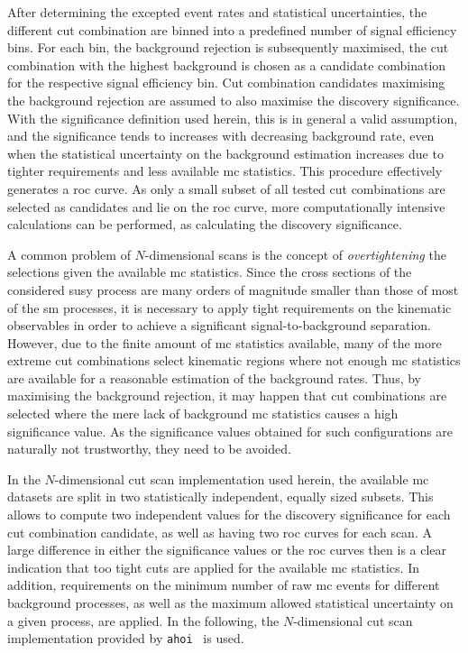 After determining the excepted event rates and statistical uncertainties, the different cut combination are binned into a predefined number of signal efficiency bins. For each bin, the background rejection is subsequently maximised, \ie the cut combination with the highest background is chosen as a candidate combination for the respective signal efficiency bin. Cut combination candidates maximising the background rejection are assumed to also maximise the discovery significance. With the significance definition used herein, this is in general a valid assumption, and the significance tends to increases with decreasing background rate, even when the statistical uncertainty on the background estimation increases due to tighter requirements and less available \gls{mc} statistics. This procedure effectively generates a \gls{roc} curve. As only a small subset of all tested cut combinations are selected as candidates and lie on the \gls{roc} curve, more computationally intensive calculations can be performed, as \eg calculating the discovery significance.

A common problem of $N$-dimensional scans is the concept of \textit{overtightening} the selections given the available \gls{mc} statistics. Since the cross sections of the considered \gls{susy} process are many orders of magnitude smaller than those of most of the \gls{sm} processes, it is necessary to apply tight requirements on the kinematic observables in order to achieve a significant signal-to-background separation. However, due to the finite amount of \gls{mc} statistics available, many of the more extreme cut combinations select kinematic regions where not enough \gls{mc} statistics are available for a reasonable estimation of the background rates. Thus, by maximising the background rejection, it may happen that cut combinations are selected where the mere lack of background \gls{mc} statistics causes a high significance value. As the significance values obtained for such configurations are naturally not trustworthy, they need to be avoided. 

In the $N$-dimensional cut scan implementation used herein, the available \gls{mc} datasets are split in two statistically independent, equally sized subsets. This allows to compute two independent values for the discovery significance for each cut combination candidate, as well as having two \gls{roc} curves for each scan. A large difference in either the significance values or the \gls{roc} curves then is a clear indication that too tight cuts are applied for the available \gls{mc} statistics. In addition, requirements on the minimum number of raw \gls{mc} events for different background processes, as well as the maximum allowed statistical uncertainty on a given process, are applied. In the following, the $N$-dimensional cut scan implementation provided by \texttt{ahoi}~\cite{ahoi} is used.


